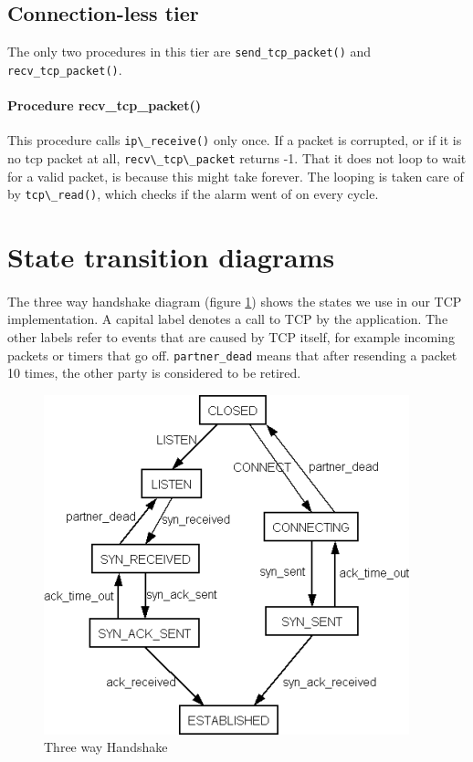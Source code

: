 \documentclass[11pt]{article}
\begin{document}
\subsection{Connection-less tier}

The only two procedures in this tier are \lstinline|send_tcp_packet()| and
\lstinline|recv_tcp_packet()|.

\paragraph{Procedure recv\_tcp\_packet()}
This procedure calls \lstinline|ip\_receive()| only once. If a packet is corrupted,
or if it is no tcp packet at all, \lstinline|recv\_tcp\_packet| returns -1.
That it does not loop to wait for a valid packet, is because this might take 
forever. The looping is taken care of by \lstinline|tcp\_read()|, which checks if the alarm 
went of on every cycle.

\appendix

\section{State transition diagrams}\label{sec:A}

\paragraph{}
The three way handshake diagram (figure \ref{figuur:handshake}) shows the
states we use in our TCP implementation. A capital label denotes a call to
TCP by the application. The other labels refer to events that are caused by
TCP itself, for example incoming packets or timers that go
off. \lstinline|partner_dead| means that after resending a packet 10 times,
the other party is considered to be retired.

\begin{figure}
\begin{center}
\includegraphics{handshake.png}
\end{center}
\caption{Three way Handshake}
\label{figuur:handshake}
\end{figure}
\end{document}
